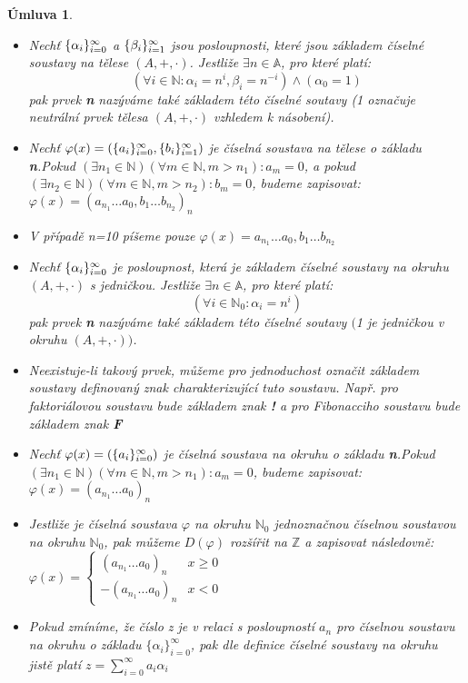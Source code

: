 \documentclass[12pt]{book}
\newtheorem*{umluva}{Úmluva}
\begin{document}
\begin{umluva}\label{u1} \textbf \newline
	\begin{itemize}
		\item Nechť $\{\alpha_i\}_{i=0}^{\infty}$ a $\{\beta_i\}_{i=1}^{\infty}$  jsou posloupnosti, které jsou základem číselné soustavy na tělese $(A,+,\cdot)$. Jestliže $\exists n \in \mathbb{A}$, pro které platí:
		      $$ (\forall i \in \mathbb{N} : \alpha_i = n^i,\beta_i = n^{-i}) \land (\alpha_{0} = 1)$$
		      pak prvek \textbf{n} nazýváme také základem této číselné soutavy (1 označuje neutrální prvek tělesa $(A,+,\cdot)$ vzhledem k násobení).
		\item Nechť $\varphi(x) = (\{a_i\}_{i=0}^{\infty},\{b_i\}_{i=1}^{\infty})$ je číselná soustava na tělese o základu \textbf{n}.\newline Pokud $(\exists n_1 \in \mathbb{N}) (\forall m \in \mathbb{N},m>n_1):a_m = 0$, a pokud $(\exists n_2 \in \mathbb{N}) (\forall m \in \mathbb{N},m>n_2):b_m = 0$, budeme zapisovat: $\varphi(x) = (a_{n_1} \dots a_0,b_1 \dots b_{n_2})_n$
		\item V případě n=10 píšeme pouze $\varphi(x) = a_{n_1} \dots a_0,b_1 \dots b_{n_2}$
		\item Nechť $\{\alpha_i\}_{i=0}^{\infty}$ je posloupnost, která je základem číselné soustavy na okruhu $(A,+,\cdot)$ s jedničkou. Jestliže $\exists n \in \mathbb{A}$, pro které platí:
		      $$ (\forall i \in \mathbb{N}_0 : \alpha_i = n^i)$$
		      pak prvek \textbf{n} nazýváme také základem této číselné soutavy $($1 je jedničkou v okruhu $(A,+,\cdot))$.
		\item Neexistuje-li takový prvek, můžeme pro jednoduchost označit základem soustavy definovaný znak charakterizující tuto soustavu. Např. pro faktoriálovou soustavu bude základem znak \textbf{!} a pro Fibonacciho soustavu bude základem znak \textbf{F}
		\item Nechť $\varphi(x) = (\{a_i\}_{i=0}^{\infty})$ je číselná soustava na okruhu o základu \textbf{n}.\newline Pokud $(\exists n_1 \in \mathbb{N}) (\forall m \in \mathbb{N},m>n_1):a_m = 0$, budeme zapisovat: $\varphi(x) = (a_{n_1} \dots a_0)_n$
		\item Jestliže je číselná soustava $\varphi$ na okruhu $\mathbb{N}_0$ jednoznačnou číselnou soustavou na okruhu $\mathbb{N}_0$, pak můžeme $D(\varphi)$ rozšířit na $\mathbb{Z}$ a zapisovat následovně: $\varphi(x) = 	\begin{cases} (a_{n_1} \dots a_0)_n &x\ge0 \\
		-(a_{n_1} \dots a_0)_n & x<0 \end{cases}$
		\item Pokud zmíníme, že číslo z je v relaci s posloupností $a_n$ pro číselnou soustavu na okruhu o základu $\{\alpha_i\}_{i=0}^\infty$, pak dle definice číselné soustavy na okruhu jistě platí $z = \sum_{i=0}^{\infty} a_{i}\alpha_{i}$
	\end{itemize}
\end{umluva}
\end{document}
